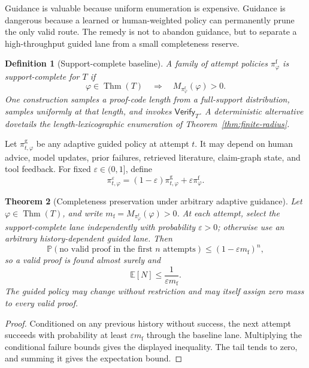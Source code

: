 \documentclass[11pt]{article}
\newtheorem{definition}{Definition}[section]
\newtheorem{theorem}[definition]{Theorem}
\newcommand{\Thm}{\operatorname{Thm}}
\newcommand{\Verify}{\mathsf{Verify}}
\newcommand{\E}{\mathbb{E}}
\newcommand{\Prob}{\mathbb{P}}
\begin{document}
Guidance is valuable because uniform enumeration is expensive.  Guidance is
dangerous because a learned or human-weighted policy can permanently prune the
only valid route.  The remedy is not to abandon guidance, but to separate a
high-throughput guided lane from a small completeness reserve.

\begin{definition}[Support-complete baseline]\label{def:support-complete}
A family of attempt policies $\pi^{\mathrm f}_\varphi$ is support-complete for
$T$ if
\[
  \varphi\in\Thm(T)
  \quad\Longrightarrow\quad
  M_{\pi^{\mathrm f}_\varphi}(\varphi)>0.
\]
One construction samples a proof-code length from a full-support distribution,
samples uniformly at that length, and invokes $\Verify_T$.  A deterministic
alternative dovetails the length-lexicographic enumeration of
Theorem~\ref{thm:finite-radius}.
\end{definition}

Let $\pi^{\mathrm g}_{t,\varphi}$ be any adaptive guided policy at attempt $t$.
It may depend on human advice, model updates, prior failures, retrieved
literature, claim-graph state, and tool feedback.  For fixed
$\varepsilon\in(0,1]$, define
\[
  \pi_{t,\varphi}^{\varepsilon}
  =(1-\varepsilon)\pi^{\mathrm g}_{t,\varphi}
   +\varepsilon\pi^{\mathrm f}_\varphi.
\]

\begin{theorem}[Completeness preservation under arbitrary adaptive guidance]
\label{thm:fair-mixture}
Let $\varphi\in\Thm(T)$, and write
$m_{\mathrm f}=M_{\pi^{\mathrm f}_\varphi}(\varphi)>0$.  At each attempt,
select the support-complete lane independently with probability
$\varepsilon>0$; otherwise use an arbitrary history-dependent guided lane.
Then
\[
  \Prob(\text{no valid proof in the first }n\text{ attempts})
  \leq(1-\varepsilon m_{\mathrm f})^n,
\]
so a valid proof is found almost surely and
\[
  \E[N]\leq\frac{1}{\varepsilon m_{\mathrm f}}.
\]
The guided policy may change without restriction and may itself assign zero
mass to every valid proof.
\end{theorem}

\begin{proof}
Conditioned on any previous history without success, the next attempt succeeds
with probability at least $\varepsilon m_{\mathrm f}$ through the baseline
lane.  Multiplying the conditional failure bounds gives the displayed
inequality.  The tail tends to zero, and summing it gives the expectation
bound.
\end{proof}
\end{document}
